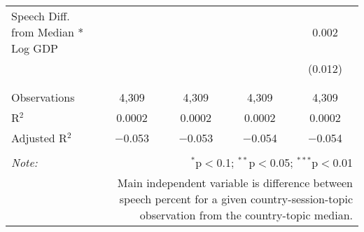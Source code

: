\begin{table}[!htbp]
\begin{tabular}{@{\extracolsep{5pt}}lcccc}
 Speech Diff. from Median * Log GDP &  &  &  & 0.002 \\ 
  &  &  &  & (0.012) \\ 
  & & & & \\ 
\hline \\[-1.8ex] 
Observations & 4,309 & 4,309 & 4,309 & 4,309 \\ 
R$^{2}$ & 0.0002 & 0.0002 & 0.0002 & 0.0002 \\ 
Adjusted R$^{2}$ & $-$0.053 & $-$0.053 & $-$0.054 & $-$0.054 \\ 
\hline 
\hline \\[-1.8ex] 
\textit{Note:}  & \multicolumn{4}{r}{$^{*}$p$<$0.1; $^{**}$p$<$0.05; $^{***}$p$<$0.01} \\ 
 & \multicolumn{4}{r}{Main independent variable is difference between speech percent for a given country-session-topic observation from the country-topic median.} \\ 
\end{tabular} 
\end{table} 
